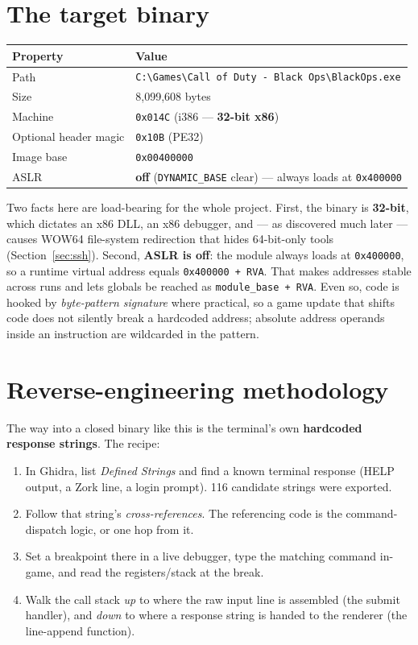 \documentclass[11pt]{article}
\newcommand{\ic}[1]{\texttt{#1}}
\begin{document}
\section{The target binary}

\begin{longtable}{@{}ll@{}}
\toprule
\textbf{Property} & \textbf{Value} \\
\midrule
Path & \texttt{C:\textbackslash Games\textbackslash Call of Duty - Black Ops\textbackslash BlackOps.exe} \\
Size & 8{,}099{,}608 bytes \\
Machine & \texttt{0x014C} (i386 --- \textbf{32-bit x86}) \\
Optional header magic & \texttt{0x10B} (PE32) \\
Image base & \texttt{0x00400000} \\
ASLR & \textbf{off} (\texttt{DYNAMIC_BASE} clear) --- always loads at \texttt{0x400000} \\
\bottomrule
\end{longtable}

\noindent
Two facts here are load-bearing for the whole project. First, the binary is
\textbf{32-bit}, which dictates an x86 DLL, an x86 debugger, and --- as discovered
much later --- causes WOW64 file-system redirection that hides 64-bit-only tools
(Section~\ref{sec:ssh}). Second, \textbf{ASLR is off}: the module always loads at
\texttt{0x400000}, so a runtime virtual address equals \texttt{0x400000 + RVA}.
That makes addresses stable across runs and lets globals be reached as
\ic{module_base + RVA}. Even so, code is hooked by \emph{byte-pattern signature}
where practical, so a game update that shifts code does not silently break a
hardcoded address; absolute address operands inside an instruction are wildcarded
in the pattern.

\section{Reverse-engineering methodology}

The way into a closed binary like this is the terminal's own \textbf{hardcoded
response strings}. The recipe:

\begin{enumerate}[nosep]
  \item In Ghidra, list \emph{Defined Strings} and find a known terminal response
  (HELP output, a Zork line, a login prompt). 116 candidate strings were exported.
  \item Follow that string's \emph{cross-references}. The referencing code is the
  command-dispatch logic, or one hop from it.
  \item Set a breakpoint there in a live debugger, type the matching command in-game,
  and read the registers/stack at the break.
  \item Walk the call stack \emph{up} to where the raw input line is assembled
  (the submit handler), and \emph{down} to where a response string is handed to the
  renderer (the line-append function).
\end{enumerate}
\end{document}
